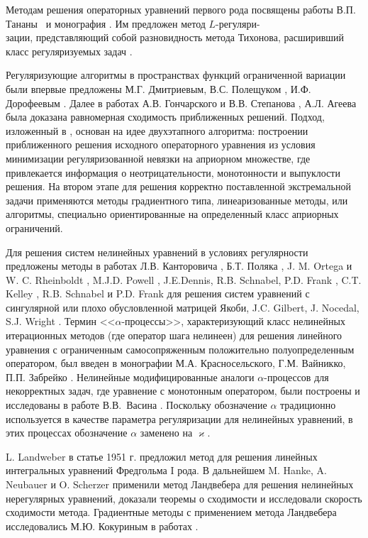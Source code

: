 {Методам решения операторных уравнений первого рода посвящены работы В.П. Тананы~\cite{Tan1977, Tan1997} и монография \cite{Tan1981}. Им предложен метод $L$-регуляри-\\зации, представляющий собой разновидность метода Тихонова, расширивший класс регуляризуемых задач \cite{Tan2003_1,Tan2003_2}.

Регуляризующие алгоритмы в пространствах функций ограниченной вариации были впервые предложены М.Г. Дмитриевым, В.С. Полещуком \cite{DmiPol1972}, И.Ф. Дорофеевым \cite{Dor1979}. Далее в работах А.В. Гончарского и В.В. Степанова \cite{GonSte1979}, А.Л. Агеева \cite{Ag1980} была доказана равномерная сходимость приближенных решений. Подход, изложенный в \cite{TikhGonSteYag1990}, основан на идее двухэтапного алгоритма: построении приближенного решения  исходного операторного уравнения из условия минимизации регуляризованной невязки на априорном множестве, где привлекается информация о неотрицательности, монотонности и выпуклости решения. 
На втором этапе для решения корректно поставленной экстремальной задачи применяются методы градиентного типа, линеаризованные методы, или алгоритмы, специально ориентированные на определенный класс априорных ограничений.

Для решения систем нелинейных уравнений в условиях регулярности предложены методы в работах Л.В. Канторовича \cite{Kan1947}, Б.Т. Поляка \cite{Pol1969}, J. M. Ortega и W. C. Rheinboldt \cite{OrtRhe1970}, M.J.D. Powell \cite{Pow1970}, J.E.Dennis, R.B. Schnabel, P.D. Frank \cite{DenSchn1996}, C.T. Kelley \cite{Kel1995}, R.B. Schnabel и P.D. Frank \cite{SchnFra1983} для решения систем уравнений с сингулярной или плохо обусловленной матрицей Якоби, J.C. Gilbert, J. Nocedal, S.J. Wright \cite{GilNoc1991, NocWri2006}. Термин <<$\alpha$-процессы>>, характеризующий класс нелинейных итерационных методов (где оператор шага нелинеен) для решения линейного уравнения с ограниченным самосопряженным положительно полуопределенным оператором, был введен в монографии М.А. Красносельского, Г.М. Вайникко, П.П. Забрейко \cite{KraVayZab1969}. Нелинейные модифицированные аналоги $\alpha$-процессов для некорректных задач, где уравнение с монотонным оператором, были построены и исследованы в работе В.В.~Васина \cite{Vasin2016}. Поскольку обозначение $\alpha$ традиционно используется в качестве параметра регуляризации для нелинейных уравнений, в этих процессах обозначение $\alpha$ заменено на $\varkappa$.

L. Landweber в статье \cite{Lan1951} 1951 г. предложил метод для решения линейных интегральных уравнений Фредгольма I рода. В дальнейшем M. Hanke, A. Neubauer и O. Scherzer \cite{HanNeuSch1995,Neu2000,NeuSch1995_2} применили метод Ландвебера для решения нелинейных нерегулярных уравнений, доказали теоремы о сходимости и исследовали скорость сходимости метода. Градиентные методы с применением метода Ландвебера исследовались М.Ю. Кокуриным в работах \cite{Kok2010_1,Kok2010_2}.

}
